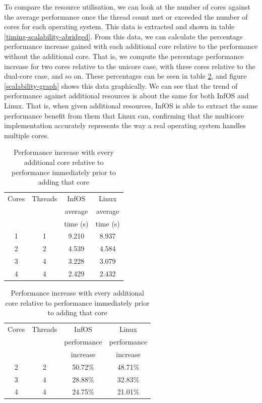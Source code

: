 \documentclass[bsc,frontabs,singlespacing,parskip,deptreport]{infthesis}
\begin{document}
To compare the resource utilisation, we can look at the number of cores against the average performance once the thread count met or exceeded the number of cores for each operating system. This data is extracted and shown in table \ref{timing-scalability-abridged}. From this data, we can calculate the percentage performance increase gained with each additional core relative to the performance without the additional core. That is, we compute the percentage performance increase for two cores relative to the unicore case, with three cores relative to the dual-core case, and so on. These percentages can be seen in table \ref{timing-scalability-percentages}, and figure \ref{scalability-graph} shows this data graphically. We can see that the trend of performance against additional resources is about the same for both InfOS and Linux. That is, when given additional resources, InfOS is able to extract the same performance benefit from them that Linux can, confirming that the multicore implementation accurately represents the way a real operating system handles multiple cores.

\begin{table}[h]
\parbox{.45\linewidth}{
\centering
\scriptsize
\begin{tabular}{cccc}\toprule
Cores & Threads & InfOS & Linux \\
& & average & average \\
& & time (s) & time (s) \\
\midrule
1 & 1 & 9.210 & 8.937 \\
\midrule
2 & 2 & 4.539 & 4.584 \\
\midrule
3 & 4 & 3.228 & 3.079 \\
\midrule
4 & 4 & 2.429 & 2.432 \\
\bottomrule
\end{tabular}
\caption{Average time taken in seconds for InfOS and Linux to execute the scalability benchmark once the thread count met or exceeded the number of cores}\label{timing-scalability-abridged}
}
\hfill
\parbox{.45\linewidth}{
\centering
\scriptsize
\begin{tabular}{cccc}\toprule
Cores & Threads & InfOS & Linux \\
& & performance & performance \\
& & increase & increase \\
\midrule
2 & 2 & 50.72\% & 48.71\% \\
\midrule
3 & 4 & 28.88\% & 32.83\% \\
\midrule
4 & 4 & 24.75\% & 21.01\% \\
\bottomrule
\end{tabular}
\caption{Performance increase with every additional core relative to performance immediately prior to adding that core}\label{timing-scalability-percentages}
}
\end{table}
\end{document}

